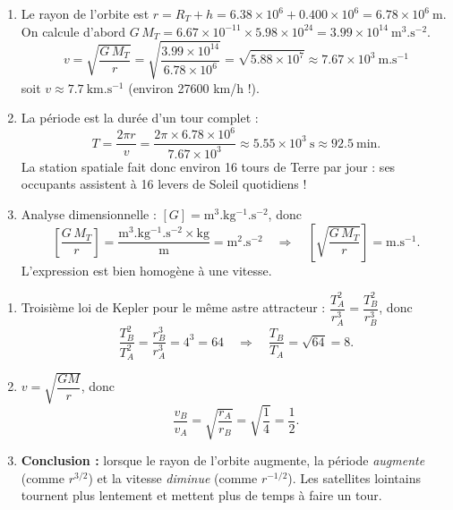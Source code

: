 \documentclass[11pt]{article}
\newcounter{popsec}
\newcounter{popsub}
\newcommand{\courssub}[1]{%
  \stepcounter{popsub}%
  \par\vspace{9pt}\noindent{\popxbold\fontsize{11.5}{13}\selectfont\color{popink}{\color{poporange}\thepopsec.\thepopsub}\hspace{6pt}#1}\par\nopagebreak\vspace{4pt}
}
\begin{document}
\begin{corrige}
\begin{enumerate}
\item Le rayon de l'orbite est $r = R_T + h = \num{6,38}\times 10^{6} + \num{0,400}\times 10^{6} = \num{6,78}\times 10^{6}\ \mathrm{m}$. On calcule d'abord $G\,M_T = \num{6,67}\times 10^{-11} \times \num{5,98}\times 10^{24} = \num{3,99}\times 10^{14}\ \mathrm{m^3.s^{-2}}$.
\[ v = \sqrt{\dfrac{G\,M_T}{r}} = \sqrt{\dfrac{\num{3,99}\times 10^{14}}{\num{6,78}\times 10^{6}}} = \sqrt{\num{5,88}\times 10^{7}} \approx \num{7,67}\times 10^{3}\ \mathrm{m.s^{-1}} \]
soit $v \approx \num{7,7}\ \mathrm{km.s^{-1}}$ (environ \num{27600} km/h !).
\item La période est la durée d'un tour complet :
\[ T = \dfrac{2\pi r}{v} = \dfrac{2\pi \times \num{6,78}\times 10^{6}}{\num{7,67}\times 10^{3}} \approx \num{5,55}\times 10^{3}\ \mathrm{s} \approx \num{92,5}\ \mathrm{min}. \]
La station spatiale fait donc environ 16 tours de Terre par jour : ses occupants assistent à 16 levers de Soleil quotidiens !
\item Analyse dimensionnelle : $[G] = \mathrm{m^3.kg^{-1}.s^{-2}}$, donc
\[ \left[\dfrac{G\,M_T}{r}\right] = \dfrac{\mathrm{m^3.kg^{-1}.s^{-2}} \times \mathrm{kg}}{\mathrm{m}} = \mathrm{m^2.s^{-2}} \quad\Longrightarrow\quad \left[\sqrt{\dfrac{G\,M_T}{r}}\right] = \mathrm{m.s^{-1}}. \]
L'expression est bien homogène à une vitesse.
\end{enumerate}
\end{corrige}

\courssub{Je m'entraîne}

\begin{corrige}
\begin{enumerate}
\item Troisième loi de Kepler pour le même astre attracteur : $\dfrac{T_A^2}{r_A^3} = \dfrac{T_B^2}{r_B^3}$, donc
\[ \dfrac{T_B^2}{T_A^2} = \dfrac{r_B^3}{r_A^3} = 4^3 = 64 \quad\Longrightarrow\quad \dfrac{T_B}{T_A} = \sqrt{64} = 8. \]
\item $v = \sqrt{\dfrac{GM}{r}}$, donc
\[ \dfrac{v_B}{v_A} = \sqrt{\dfrac{r_A}{r_B}} = \sqrt{\dfrac{1}{4}} = \dfrac{1}{2}. \]
\item \textbf{Conclusion :} lorsque le rayon de l'orbite augmente, la période \emph{augmente} (comme $r^{3/2}$) et la vitesse \emph{diminue} (comme $r^{-1/2}$). Les satellites lointains tournent plus lentement et mettent plus de temps à faire un tour.
\end{enumerate}
\end{corrige}
\end{document}
